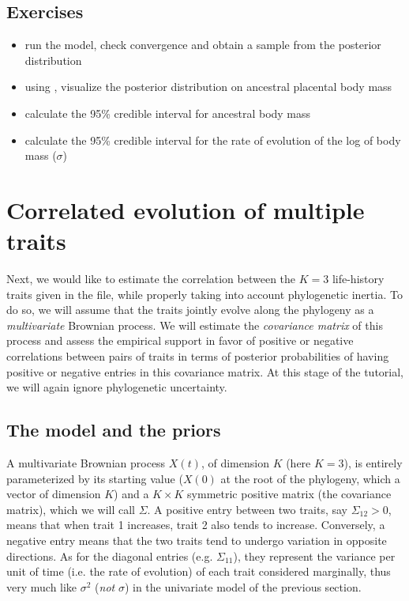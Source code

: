 \subsection*{Exercises}

\begin{itemize}
\item
run the model, check convergence and obtain a sample from the posterior distribution
\item
using , visualize the posterior distribution on ancestral placental body mass
\item
calculate the 95\% credible interval for ancestral body mass
\item
calculate the 95\% credible interval for the rate of evolution of the log of body mass ($\sigma$)
\end{itemize}



\section{Correlated evolution of multiple traits}
\label{multivariate}

Next, we would like to estimate the correlation between the $K=3$ life-history traits given in the  file, while properly taking into account phylogenetic inertia. 
To do so, we will assume that the traits jointly evolve along the phylogeny as a \emph{multivariate} Brownian process.
We will estimate the \emph{covariance matrix} of this process and assess the empirical support in favor of positive or negative correlations between pairs of traits in terms of posterior probabilities of having positive or negative entries in this covariance matrix.
At this stage of the tutorial, we will again ignore phylogenetic uncertainty.

\subsection{The model and the priors}

A multivariate Brownian process $X(t)$, of dimension $K$ (here $K=3$),
is entirely parameterized by its starting value ($X(0)$ at the root of the phylogeny, which a vector of dimension $K$) and a $K \times K$ symmetric positive matrix (the covariance matrix), which we will call $\Sigma$.
A positive entry between two traits, say $\Sigma_{12} > 0$, means that when trait 1 increases, trait 2 also tends to increase. Conversely, a negative entry means that the two traits tend to undergo variation in opposite directions.
As for the diagonal entries (e.g. $\Sigma_{11}$), they represent the variance per unit of time (i.e. the rate of evolution) of each trait considered marginally,
thus very much like $\sigma^2$ (\emph{not} $\sigma$) in the univariate model of the previous section.

